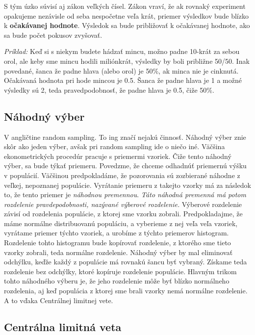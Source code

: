 S tým úzko súvisí aj zákon veľkých čísel. Zákon vraví, že ak rovnaký
experiment opakujeme nezávisle od seba nespočetne veľa krát, priemer
výsledkov bude blízko k \textbf{očakávanej hodnote}. Výsledok sa bude
približovať k očakávanej hodnote, ako sa bude počet pokusov zvyšovať.

\emph{Príklad:} Keď si s niekym budete hádzať mincu, možno padne 10-krát
za sebou orol, ale keby sme mincu hodili miliónkrát, výsledky by boli
približne 50/50. Inak povedané, šanca že padne hlava (alebo orol) je
50\%, ak minca nie je cinknutá. Očakávaná hodnota pri hode mincou je
0.5. Šanca že padne hlava je 1 a možné výsledky sú 2, teda
pravedpodobnosť, že padne hlava je 0.5, čiže 50\%.

\hypertarget{nuxe1hodnuxfd-vuxfdber}{%
\subsection{Náhodný výber}\label{nuxe1hodnuxfd-vuxfdber}}

V angličtine random sampling. To ing značí nejakú činnosť. Náhodný výber
znie skôr ako jeden výber, avšak pri random sampling ide o niečo iné.
Väčšina ekonometrických procedúr pracuje s priemermi vzoriek. Čiže tento
náhodný výber, sa bude týkať priemeru. Povedzme, že chceme odhadnúť
priemernú výšku v populácií. Väčšinou predpokladáme, že pozorovania sú
zozbierané náhodne z veľkej, nepoznanej populácie. Vyrátanie priemeru z
takejto vzorky má za následok to, že tento priemer je \emph{náhodnou
premennou}. \emph{Táto náhodná premenná má potom rozdelenie
pravdepodobnosti, nazývané výberové rozdelenie.} Výberové rozdelenie
závisí od rozdelenia populácie, z ktorej sme vzorku zobrali.
Predpokladajme, že máme normálne distribuovanú populáciu, a vyberieme z
nej veľa veľa vzoriek, vyrátame priemer týchto vzoriek, a urobíme z
týchto priemerov histogram. Rozdelenie tohto histogramu bude kopírovať
rozdelenie, z ktorého sme tieto vzorky zobrali, teda normálne
rozdelenie. Náhodný výber by mal eliminovať odchýlku, keďže každý z
populácie má rovnakú šancu byť vybraný. Získame teda rozdelenie bez
odchýlky, ktoré kopíruje rozdelenie populácie. Hlavným trikom tohto
náhodného výberu je, že jeho rozdelenie môže byť blízko normálneho
rozdelenia, aj keď populácia z ktorej sme brali vzorky nemá normálne
rozdelenie. A to vďaka Centrálnej limitnej vete.

\hypertarget{centruxe1lna-limitnuxe1-veta}{%
\subsection{Centrálna limitná veta}\label{centruxe1lna-limitnuxe1-veta}}

